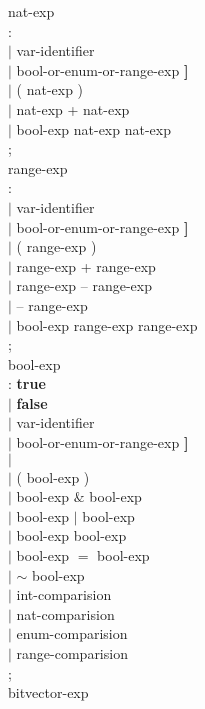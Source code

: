 \begin{tab}
\begin{tabbing}
nat-exp \\
\>: \NATNUM  \\
\>$|$ var-identifier \\
\>$|$ \ARRAYORBITVECID {\bf [} bool-or-enum-or-range-exp {\bf ]} \\
\>$|$ ( nat-exp ) \\
\>$|$ nat-exp + nat-exp \\
\>$|$ \IF bool-exp \THEN nat-exp \ELSE nat-exp \FI \\
\>; \\

range-exp \\
\>: \NATNUM  \\
\>$|$ var-identifier \\
\>$|$ \ARRAYORBITVECID {\bf [} bool-or-enum-or-range-exp {\bf ]} \\
\>$|$ ( range-exp ) \\
\>$|$ range-exp + range-exp \\
\>$|$ range-exp -- range-exp \\
\>$|$ -- range-exp \\
\>$|$ \IF bool-exp \THEN range-exp \ELSE range-exp \FI \\
\>; \\


bool-exp \\
\>: {\bf true} \\
\>$|$ {\bf false} \\
\>$|$ var-identifier \\
\>$|$ \ARRAYORBITVECID {\bf [} bool-or-enum-or-range-exp {\bf ]} \\
\>$|$ \EVENTQUERY  \\
\>$|$ ( bool-exp ) \\
\>$|$ bool-exp $\&$ bool-exp \\
\>$|$ bool-exp $|$ bool-exp \\
\>$|$ bool-exp \EQUIV bool-exp \\
\>$|$ bool-exp $=$ bool-exp \\
\>$|$ $\sim$ bool-exp \\
\>$|$ int-comparision \\
\>$|$ nat-comparision \\
\>$|$ enum-comparision \\
\>$|$ range-comparision \\
\>; \\

bitvector-exp \\
\>: var-identifier \\
\>$|$ \ARRAYORBITVECID {\bf [} bool-or-enum-or-range-exp {\bf ]} \\
\>$|$ ( bitvector-exp ) \\
\>$|$ bitvector-exp $\&$ bitvector-exp \\
\>$|$ bitvector-exp $|$ bitvector-exp \\
\>$|$ bitvector-exp \EQUIV bitvector-exp \\
\>$|$ bitvector-exp $=$ bitvector-exp \\
\>$|$ $\sim$ bitvector-exp \\
\>; \\



\end{tabbing}
\end{tab}
